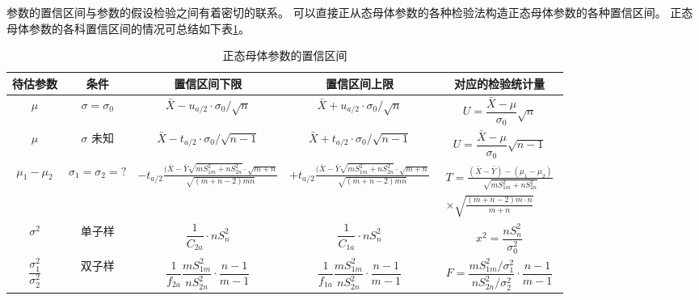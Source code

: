 \begin{enumerate}[1)]
		参数的置信区间与参数的假设检验之间有着密切的联系。
		可以直接正从态母体参数的各种检验法构造正态母体参数的各种置信区间。
		正态母体参数的各科置信区间的情况可总结如下表\ref{tabel3}。
		\begin{table}
			\caption{正态母体参数的置信区间}  %
			\begin{center}   %
				\begin{tabular}{ccccc}  %
					\toprule    %
					待估参数   & 条件  & 置信区间下限 & 置信区间上限 & 对应的检验统计量 \\ \midrule  %
					$ \mu  $  & $  \sigma=\sigma_{0} $    & $ \bar{X}-u_{a / 2} \cdot \sigma_{0} / \sqrt{n} $    & $ \bar{X}+u_{a / 2} \cdot \sigma_{0} / \sqrt{n} $    & $ U= \dfrac{\bar{X}-\mu}{\sigma_{0}} \sqrt{n}    $   \\
					$ \mu  $  & $  \sigma $  未知  & $ \bar{X}-t_{a / 2} \cdot \sigma_{0} / \sqrt{n-1} $    & $ \bar{X}+t_{a / 2} \cdot \sigma_{0} / \sqrt{n-1} $    & $ U= \dfrac{\bar{X}-\mu}{\sigma_{0}} \sqrt{n-1}    $   \\ \midrule 
					$\mu_1-\mu_2$  &  $\sigma_1 = \sigma_2 = ? $ & $ -t_{a / 2} \frac{(\bar{X}-\bar{Y} \sqrt{m S_{1 m}^{2}+n S_{2 n}^{2}} \cdot \sqrt{m+n}}{\sqrt{(m+n-2) m n}}$
					&$  +t_{a / 2} \frac{(\bar{X}-\bar{Y} \sqrt{m S_{1 m}^{2}+n S_{2 n}^{2}} \cdot \sqrt{m+n}}{\sqrt{(m+n-2) m n}}  $  & $ \begin{aligned}
					T= \frac{(\bar{X}-\bar{Y})-\left(\mu_{1}-\mu_{2}\right)}{\sqrt{m S_{1 m}^{2}+n S_{2 n}^{2}}} \\
					\times \sqrt{\frac{(m+n-2) m \cdot n}{m+n}}
					\end{aligned}   $    \\ \midrule
					$\sigma^2 $  &    单子样  & $ \dfrac{1}{C_{2 a}} \cdot n S_{n}^{2}$    &
					$ \dfrac{1}{C_{1 a}} \cdot n S_{n}^{2}$ & $ x^{2}=\dfrac{n S_{n}^{2}}{\sigma_{0}^{2}} $  \\\midrule
					$\dfrac{\sigma_1 ^2}{\sigma_2 ^2}$  & 双子样 & $ \dfrac{1}{f_{2 a}} \dfrac{m S_{1 m}^{2}}{n S_{2 n}^{2}} \cdot \dfrac{n-1}{m-1} $    &
					$ \dfrac{1}{f_{1 a}} \dfrac{m S_{1 m}^{2}}{n S_{2 n}^{2}} \cdot \dfrac{n-1}{m-1}  $ & $ F=\dfrac{m S_{1 m}^{2} / \sigma_{1}^{2}}{n S_{2 n}^{2} / \sigma_{2}^{2}} \cdot \dfrac{n-1}{m-1}  $    \\  
					\bottomrule   %
				\end{tabular}
			\label{tabel3}
			\end{center}
		\end{table}
	

\end{enumerate}
